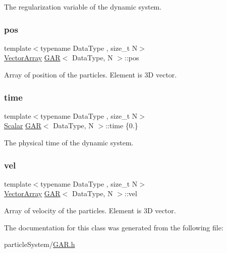 The regularization variable of the dynamic system. 

\mbox{\label{class_g_a_r_aec6b3fdb2c4dd7bdae27c0b41fbf6dda}} 
\subsubsection{\texorpdfstring{pos}{pos}}
{\footnotesize\ttfamily template$<$typename Data\+Type , size\+\_\+t N$>$ \\
\mbox{\hyperlink{class_g_a_r_a5818e17eb203504af6e10f38fc38d378}{Vector\+Array}} \mbox{\hyperlink{class_g_a_r}{G\+AR}}$<$ Data\+Type, N $>$\+::pos}



Array of position of the particles. Element is 3D vector. 

\mbox{\label{class_g_a_r_afaec5fb6242a3e5ae5cd368832cd1bb8}} 
\subsubsection{\texorpdfstring{time}{time}}
{\footnotesize\ttfamily template$<$typename Data\+Type , size\+\_\+t N$>$ \\
\mbox{\hyperlink{class_g_a_r_a2ae44eda8e28d5dd26cf707dcda69314}{Scalar}} \mbox{\hyperlink{class_g_a_r}{G\+AR}}$<$ Data\+Type, N $>$\+::time \{0.\}}



The physical time of the dynamic system. 

\mbox{\label{class_g_a_r_a9619f6250eb37cb006bd508591f01997}} 
\subsubsection{\texorpdfstring{vel}{vel}}
{\footnotesize\ttfamily template$<$typename Data\+Type , size\+\_\+t N$>$ \\
\mbox{\hyperlink{class_g_a_r_a5818e17eb203504af6e10f38fc38d378}{Vector\+Array}} \mbox{\hyperlink{class_g_a_r}{G\+AR}}$<$ Data\+Type, N $>$\+::vel}



Array of velocity of the particles. Element is 3D vector. 



The documentation for this class was generated from the following file\+:\begin{DoxyCompactItemize}
\item 
particle\+System/\mbox{\hyperlink{_g_a_r_8h}{G\+A\+R.\+h}}\end{DoxyCompactItemize}
